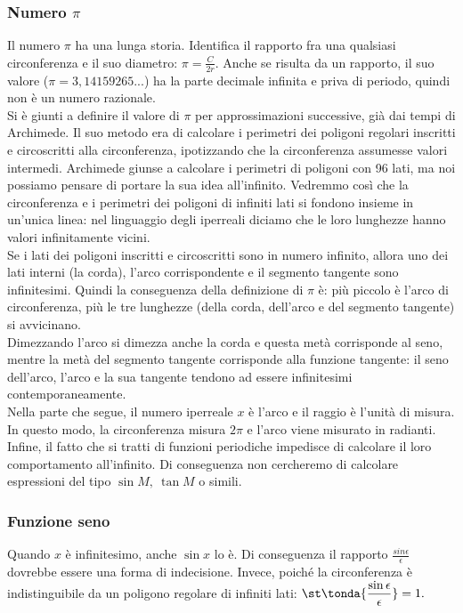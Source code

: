 \subsubsection{Numero \(\pi\)}
\label{subsubsec:insnum_pigreco}
Il numero \(\pi\) ha una lunga storia. Identifica 
il rapporto fra una qualsiasi circonferenza e il suo diametro: 
\(\pi=\frac{C}{2r}\). 
Anche se risulta da un rapporto, il suo valore (\(\pi=3,14159265...\)) 
ha la parte decimale infinita e priva di periodo, quindi non è un numero 
razionale.\\
Si è giunti a definire il valore di \(\pi\) per approssimazioni
successive, già dai tempi di Archimede. Il suo metodo era di
calcolare i perimetri dei poligoni regolari inscritti e
circoscritti alla circonferenza, ipotizzando che la circonferenza
assumesse valori intermedi. Archimede giunse a calcolare i perimetri
di poligoni con 96 lati, ma noi possiamo pensare di portare la sua idea
all'infinito. Vedremmo così che la circonferenza e i perimetri dei poligoni 
di infiniti lati si fondono insieme in un'unica linea: nel linguaggio degli
iperreali diciamo che le loro lunghezze hanno valori infinitamente vicini.\\
Se i lati dei poligoni inscritti e circoscritti sono in numero infinito,
allora uno dei lati interni (la corda), l'arco corrispondente e il segmento 
tangente sono infinitesimi. 
Quindi la conseguenza della definizione di \(\pi\) è:
più piccolo è l'arco di circonferenza, più le tre lunghezze (della corda, 
dell'arco e del segmento tangente) si avvicinano.\\
Dimezzando l'arco si dimezza anche la corda e questa metà corrisponde al seno,
mentre la metà del segmento tangente corrisponde alla funzione tangente:
il seno dell'arco, l'arco e la sua tangente tendono  ad essere 
infinitesimi contemporaneamente.\\
Nella parte che segue, il numero iperreale \(x\) è l'arco e il raggio è l'unità 
di misura. In questo modo, la circonferenza misura \(2\pi\) e l'arco 
viene misurato in radianti.\\
Infine, il fatto che si tratti di funzioni periodiche impedisce di calcolare
il loro comportamento all'infinito. Di conseguenza non cercheremo di 
calcolare 
espressioni del tipo \(\sin M,\ \tan M\) o simili.

\subsubsection{Funzione seno}
\label{subsubsec:insnum_fseno}
Quando \(x\) è infinitesimo, anche \(\sin x\) lo è. Di conseguenza il rapporto
\(\frac{sin\epsilon}{\epsilon}\) dovrebbe essere una forma di indecisione. 
Invece, poiché la circonferenza è indistinguibile da un poligono regolare di 
infiniti lati: \qquad
\(\displaystyle
 \st\tonda{\frac{\sin \epsilon}{\epsilon}}=1.
\)

